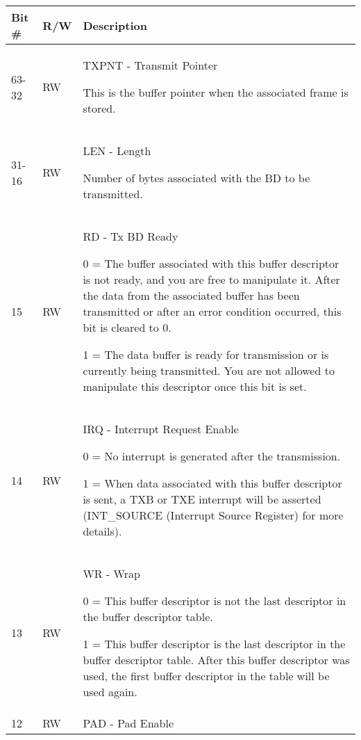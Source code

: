 \begin{table}[H]
  \centering
  \begin{tabularx}{\textwidth}{|l|l|X|}
    
    \hline
    \rowcolor{iob-green}
    {\bf Bit \#} & {\bf R/W} & {\bf Description} \\ \hline

    63-32   & RW  & TXPNT - Transmit Pointer

                This is the buffer pointer when the associated frame is
                stored.\\ \hline
    \rowcolor{iob-blue}
    31-16   & RW & LEN - Length

                 Number of bytes associated with the BD to be transmitted.\\
                 \hline
    15      & RW & RD - Tx BD Ready

                0 = The buffer associated with this buffer descriptor is not
                ready, and you are free to manipulate it. After the data from
                the associated buffer has been transmitted or after an error
                condition occurred, this bit is cleared to 0.

                1 = The data buffer is ready for transmission or is currently
                being transmitted. You are not allowed to manipulate this
                descriptor once this bit is set. \\ \hline
    \rowcolor{iob-blue}
    14      & RW & IRQ - Interrupt Request Enable

                0 = No interrupt is generated after the transmission.

                1 = When data associated with this buffer descriptor is sent, a
                TXB or TXE interrupt will be asserted (INT\_SOURCE (Interrupt
                Source Register) for more details).\\ \hline
    13      & RW & WR - Wrap

                0 = This buffer descriptor is not the last descriptor in the
                buffer descriptor table.

                1 = This buffer descriptor is the last descriptor in the buffer
                descriptor table. After this buffer descriptor was used, the
                first buffer descriptor in the table will be used again. \\
                \hline
    \rowcolor{iob-blue}
    12      & RW & PAD - Pad Enable


\end{tabularx}
\end{table}
